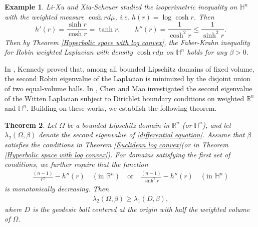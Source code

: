 \documentclass[11pt,leqno]{amsart}
\newtheorem{theorem}{Theorem}[section]\newtheorem{thm}[theorem]{Theorem}
\newtheorem{example}[theorem]{Example}
\def\R{\mathbb{R}}
\numberwithin{equation}{section}
\begin{document}
\begin{example}
    Li-Xu \cite{LihaizhongPAMS} and Xia-Scheuer \cite{XiachaoTAMS} studied the isoperimetric inequality on $\mathbb{H}^{n}$ with the weighted measure $\cosh r d\mu$, i.e. $h(r)=\log \cosh r$. Then  
    $$h'(r)=\frac{\sinh r}{\cosh r}=\tanh r, \qquad h''(r)=\frac{1}{\cosh^{2}r}\leq \frac{1}{\sinh^{2}r}.$$ 
    Then by Theorem \ref{Hyperbolic space with log convex}, the Faber-Krahn  inequality for Robin weighted Laplacian with density  $\cosh r d\mu$ on $\mathbb{H}^{n}$ holds for any   $\beta>0$.
\end{example}


In \cite{KennegyPAMS}, Kennedy proved that, among all bounded Lipschitz domains of fixed volume, the second Robin eigenvalue of the Laplacian  is minimized by the disjoint union of two equal-volume balls. In \cite{Maojing2025}, Chen and Mao investigated the second eigenvalue of the Witten Laplacian subject to Dirichlet boundary conditions on weighted $\mathbb{R}^n$ and $\mathbb{H}^n$. Building on these works, we establish the following theorem.
\begin{theorem}\label{thm3}
Let $\Omega$ be a bounded Lipschitz domain in $\R^n$ (or $\mathbb{H}^n$), and let $\lambda_2(\Omega,\beta)$ denote the second eigenvalue of \eqref{differential equation}. Assume that $\beta$ satisfies the conditions in Theorem \ref{Euclidean log convex}(or in Theorem \ref{Hyperbolic space with log convex}). For domains satisfying the first set of conditions, we further require that the function
\begin{align*}
    \frac{(n-1)}{r^2}-h''(r) \quad (\text{in $\R^n$} )\quad \text{or}\quad   \frac{(n-1)}{\sinh^2r}-h''(r) \quad (\text{in $\mathbb{H}^n$} )
\end{align*}
 is monotonically decreasing. Then
\begin{align}
    \lambda_2(\Omega,\beta)\ge \lambda_1(D,\beta),
\end{align}
where $D$ is the geodesic ball centered at the origin with  half the weighted volume of $\Omega$.
\end{theorem}
\end{document}
